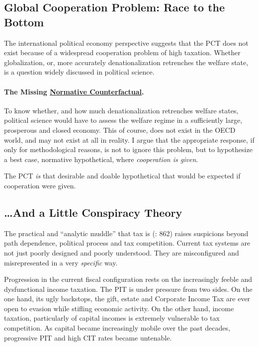 \subsection[Global Cooperation Problem]{Global Cooperation Problem: Race to the Bottom} The international political economy perspective suggests that the PCT does not exist because of a widespread cooperation problem of high taxation. Whether globalization, or, more accurately denationalization retrenches the welfare state, is a question widely discussed in political science. 


\paragraph{The Missing \href{http://maxheld.de/2009/10/13/setting-goalposts/}{Normative Counterfactual}.} 
To know whether, and how much denationalization retrenches welfare states, political science would have to assess the welfare regime in a sufficiently large, prosperous and closed economy. This of course, does not exist in the OECD world, and may not exist at all in reality. I argue that the appropriate response, if only for methodological reasons, is not to ignore this problem, but to hypothesize a best case, normative hypothetical, where \emph{cooperation is given}. 

The PCT \emph{is} that desirable and doable hypothetical that would be expected if cooperation were given.

\subsection[Conspiracy Theory]{\ldots And a Little Conspiracy Theory} \label{sec:Conspiracy} The practical and ``analytic muddle'' that tax is (\citealt{McCaffery2005}: 862) raises suspicions beyond path dependence, political process and tax competition. Current tax systems are not just poorly designed and poorly understood. They are misconfigured and misrepresented in a very \emph{specific} way.

Progression in the current fiscal configuration rests on the increasingly feeble and dysfunctional income taxation. The PIT is under pressure from two sides. On the one hand, its ugly backstops, the gift, estate and Corporate Income Tax are ever open to evasion while stifling economic activity. On the other hand, income taxation, particularly of capital incomes is extremely vulnerable to tax competition. As capital became increasingly mobile over the past decades, progressive PIT and high CIT rates became untenable. 

